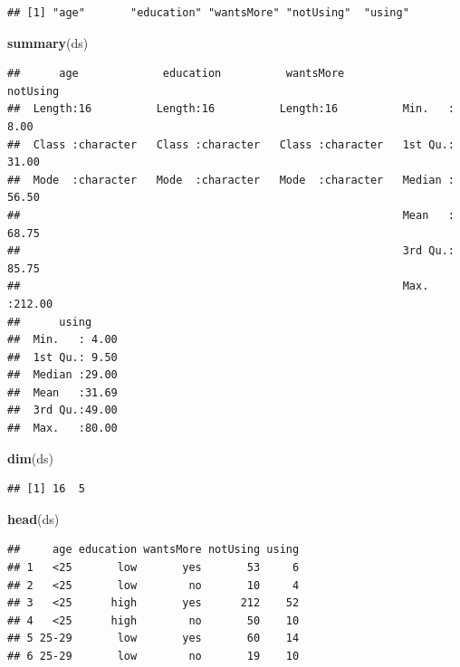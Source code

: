 \documentclass[
]{article}
\newenvironment{Shaded}{\begin{snugshade}}{\end{snugshade}}
\newcommand{\FunctionTok}[1]{\textcolor[rgb]{0.13,0.29,0.53}{\textbf{#1}}}
\newcommand{\NormalTok}[1]{#1}
\begin{document}
\begin{verbatim}
## [1] "age"       "education" "wantsMore" "notUsing"  "using"
\end{verbatim}

\begin{Shaded}
\begin{Highlighting}[]
\FunctionTok{summary}\NormalTok{(ds)}
\end{Highlighting}
\end{Shaded}

\begin{verbatim}
##      age             education          wantsMore            notUsing     
##  Length:16          Length:16          Length:16          Min.   :  8.00  
##  Class :character   Class :character   Class :character   1st Qu.: 31.00  
##  Mode  :character   Mode  :character   Mode  :character   Median : 56.50  
##                                                           Mean   : 68.75  
##                                                           3rd Qu.: 85.75  
##                                                           Max.   :212.00  
##      using      
##  Min.   : 4.00  
##  1st Qu.: 9.50  
##  Median :29.00  
##  Mean   :31.69  
##  3rd Qu.:49.00  
##  Max.   :80.00
\end{verbatim}

\begin{Shaded}
\begin{Highlighting}[]
\FunctionTok{dim}\NormalTok{(ds)}
\end{Highlighting}
\end{Shaded}

\begin{verbatim}
## [1] 16  5
\end{verbatim}

\begin{Shaded}
\begin{Highlighting}[]
\FunctionTok{head}\NormalTok{(ds)}
\end{Highlighting}
\end{Shaded}

\begin{verbatim}
##     age education wantsMore notUsing using
## 1   <25       low       yes       53     6
## 2   <25       low        no       10     4
## 3   <25      high       yes      212    52
## 4   <25      high        no       50    10
## 5 25-29       low       yes       60    14
## 6 25-29       low        no       19    10
\end{verbatim}
\end{document}
